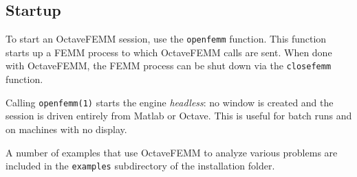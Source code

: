 \documentclass[12pt]{article}
\begin{document}
\subsection{Startup}
To start an OctaveFEMM session, use the {\tt openfemm} function.
This function starts up a FEMM process to which OctaveFEMM calls
are sent. When done with OctaveFEMM, the FEMM process can be shut
down via the {\tt closefemm} function.

Calling {\tt openfemm(1)} starts the engine {\em headless}: no window is
created and the session is driven entirely from Matlab or Octave.  This is
useful for batch runs and on machines with no display.

A number of examples that use OctaveFEMM to analyze various problems are
included in the \verb+examples+ subdirectory of the installation folder.

%
%









\end{document}
